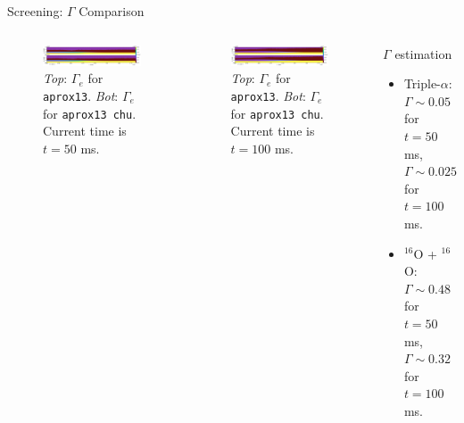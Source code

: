 \documentclass[
	11pt, %
]{beamer}
\begin{document}
\begin{frame}{Screening: $\Gamma$ Comparison}
\begin{columns}
    
    \begin{figure}
        \centering
        \includegraphics[width=1\linewidth]{screen_gamma_50ms.pdf}
        \caption{\scriptsize {\it Top}: $\Gamma_e$ for {\tt aprox13}. {\it Bot}: $\Gamma_e$ for {\tt aprox13 chu}. Current time is $t = 50$ ms.}
    \end{figure}
    
    \begin{figure}
        \centering
        \includegraphics[width=1\linewidth]{screen_gamma_100ms.pdf}
        \caption{\scriptsize {\it Top}: $\Gamma_e$ for {\tt aprox13}. {\it Bot}: $\Gamma_e$ for {\tt aprox13 chu}. Current time is $t = 100$ ms.}
    \end{figure}

    \begin{block}{\scriptsize $\Gamma$ estimation}
        \begin{itemize}
            \item \scriptsize Triple-$\alpha$: $\Gamma \sim 0.05$ for $t = 50$ ms, $\Gamma \sim 0.025$ for $t = 100$ ms.
            \item \scriptsize ${}^{16}$O + ${}^{16}$O:             $\Gamma \sim 0.48$ for $t = 50$ ms, $\Gamma \sim 0.32$ for $t = 100$ ms.
        \end{itemize}
    \end{block}
    \end{columns}
\end{frame}
\end{document}
